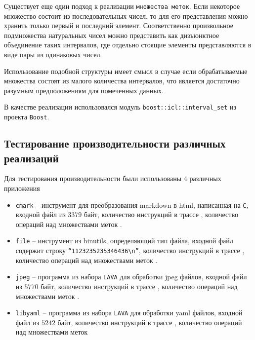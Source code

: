 Существует еще один подход к реализации \texttt{множества меток}. Если некоторое множество состоит из последовательных чисел, то для его представления можно хранить только первый и последний элемент. Соответственно произвольное подмножества натуральных чисел можно представить как дизъюнктное объединение таких интервалов, где отдельно стоящие элементы представляются в виде пары из одинаковых чисел.

Использование подобной структуры имеет смысл в случае если обрабатываемые множества состоят из малого количества интервалов, что является достаточно разумным предположениям для помеченных данных.

В качестве реализации использовался модуль \texttt{boost::icl::interval\_set} из проекта \texttt{Boost}.


\subsection{Тестирование производительности различных реализаций}

Для тестирования производительности были использованы 4 различных приложения

\begin{itemize}
    \item \texttt{cmark} -- инструмент для преобразования markdown в html, написанная на \texttt{C}, входной файл из $3379$ байт, количество инструкций в трассе , количество операций над множествами меток .
    \item \texttt{file} -- инструмент из binutils, определяющий тип файла, входной файл содержит строку \texttt{``1123235235346436\textbackslash n''}, количество инструкций в трассе , количество операций над множествами меток .
    \item \texttt{jpeg} -- программа из набора \texttt{LAVA} \cite{LAVA} для обработки jpeg файлов, входной файл из $5770$ байт, количество инструкций в трассе , количество операций над множествами меток .
    \item \texttt{libyaml} -- программа из набора \texttt{LAVA} для обработки yaml файлов, входной файл из $5242$ байт, количество инструкций в трассе , количество операций над множествами меток 
\end{itemize}

